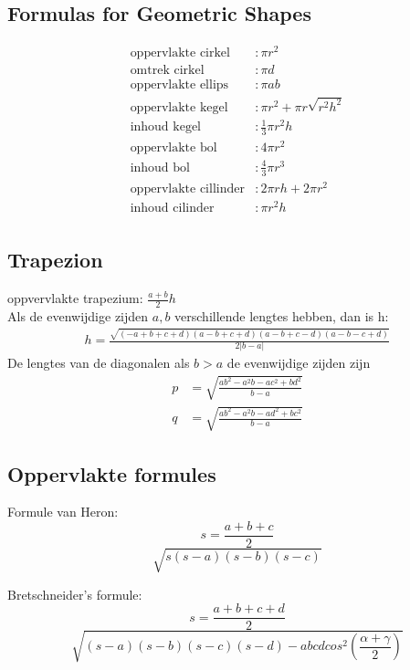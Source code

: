 \documentclass[a4paper, twocolumn]{article}
\begin{document}
\subsection*{Formulas for Geometric Shapes}
\vspace{-1em}
\begin{align*}
\text{oppervlakte cirkel}   &: \pi r^2 \\
\text{omtrek cirkel}        &: \pi d \\
\text{oppervlakte ellips}   &: \pi a b \\
\text{oppervlakte kegel}    &: \pi r^2 + \pi r \sqrt{r^2 h^2} \\
\text{inhoud kegel}         &: \frac{1}{3}\pi r^2 h \\
\text{oppervlakte bol}      &: 4 \pi r^2 \\
\text{inhoud bol}           &: \frac{4}{3} \pi r^3 \\
\text{oppervlakte cillinder}&: 2\pi rh + 2\pi r^2 \\
\text{inhoud cilinder}      &: \pi r^2 h\\
\end{align*}

\subsection{Trapezion}
oppvervlakte trapezium: $\frac{a+b}{2}h$\\
Als de evenwijdige zijden $a,b$ verschillende lengtes hebben, dan is h:
\begin{align*}
h = \frac{\sqrt{(-a+b+c+d)(a-b+c+d)(a-b+c-d)(a-b-c+d)}}{2|b-a|}
\end{align*}
De lengtes van de diagonalen als $b>a$ de evenwijdige zijden zijn
\begin{align*}
p &= \sqrt{\frac{ab^2-a^2b-ac^2+bd^2}{b-a}}\\
q &= \sqrt{\frac{ab^2-a^2b-ad^2+bc^2}{b-a}}
\end{align*}

\subsection{Oppervlakte formules}
Formule van Heron:\\
$$s = \frac{a+b+c}{2}$$
$$\sqrt{s(s-a)(s-b)(s-c)}$$

Bretschneider's formule:\\
$$s = \frac{a+b+c+d}{2}$$
$$\sqrt{(s-a)(s-b)(s-c)(s-d)-abcd cos^2\left(\frac{\alpha+\gamma}{2}\right)}$$
\end{document}
